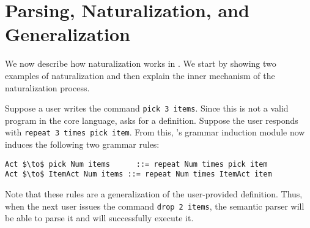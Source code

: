 \section{Parsing, Naturalization, and Generalization}
\label{sec:naturalization}


We now describe how naturalization works in \tool.
We start by showing two examples of naturalization and then
explain the inner mechanism of the naturalization process.

\begin{example}\label{ex:pick-3-items}
Suppose a user writes the command \lstinline{pick 3 items}. Since this is not a valid program
in the core language, \tool asks for a definition.
Suppose the user responds with \lstinline{repeat 3 times pick item}.
From this, \tool's grammar induction module now induces the following
two grammar rules:
\begin{lstlisting}
Act $\to$ pick Num items      ::= repeat Num times pick item
Act $\to$ ItemAct Num items ::= repeat Num times ItemAct item
\end{lstlisting}
%
Note that these rules are a generalization of the user-provided definition.
Thus, when the next user issues the command \lstinline{drop 2 items}, the semantic parser
will be able to parse it and \tool will successfully execute it.
\end{example}

